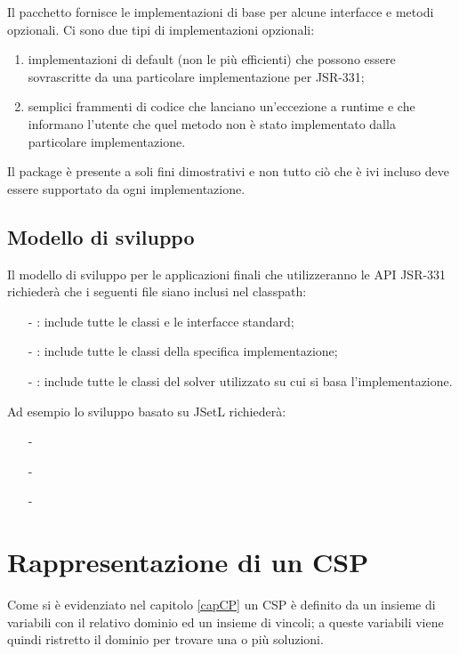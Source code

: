 Il pacchetto  fornisce le implementazioni di
base per alcune interfacce e metodi opzionali. Ci sono due tipi di
implementazioni opzionali:
\begin{enumerate}
\item implementazioni di default (non le più efficienti) che possono
essere sovrascritte da una particolare implementazione per JSR-331;
\item semplici frammenti di codice che lanciano un'eccezione a runtime e che 
informano l'utente che quel metodo non è stato implementato dalla
particolare implementazione.
\end{enumerate}

\begin{nota}
Il package  è presente a soli fini dimostrativi e
non tutto ciò che è ivi incluso deve essere supportato da ogni implementazione.
\end{nota}

\subsection{Modello di sviluppo}
Il modello di sviluppo per le applicazioni finali che utilizzeranno le
API JSR-331 richiederà che i seguenti file  siano inclusi nel 
classpath:
\begin{itemize}
\item[-]: include tutte le classi e le interfacce standard;
\item[-]: include tutte le classi della specifica
implementazione;
\item[-]: include tutte le classi del solver utilizzato su 
cui si basa l'implementazione.
\end{itemize}
Ad esempio lo sviluppo basato su JSetL richiederà:
\begin{itemize}
\item[-]
\item[-]
\item[-]
\end{itemize}

\section{Rappresentazione di un CSP}
Come si è evidenziato nel capitolo \ref{capCP} un CSP è definito da un insieme
di variabili con il relativo dominio ed un insieme di vincoli; a queste 
variabili viene quindi ristretto il dominio per trovare una o più soluzioni.

